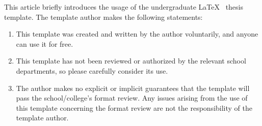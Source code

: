 \begin{abstract}
	
本文简要介绍了本科毕业论文\LaTeX 模板的使用方法。在此，模板作者作声明如下：
\begin{enumerate}
    \item 本模板为作者无偿制作撰写，任何人都可以免费使用本模板。
    \item 本模板未经学校相关部门审核及授权，在使用前请务必斟酌。
    \item 作者不对模板能够通过学校/学院的格式审查做任何明示或暗示的保证，任何由于使用本模板而引起的论文格式审查问题均与本模板作者无关。	
\end{enumerate}




\end{abstract}

\begin{englishabstract}

This article briefly introduces the usage of the undergraduate  \LaTeX~ thesis template. The template author makes the following statements:
\begin{enumerate}
    \item This template was created and written by the author voluntarily, and anyone can use it for free.
    \item This template has not been reviewed or authorized by the relevant school departments, so please carefully consider its use.
    \item The author makes no explicit or implicit guarantees that the template will pass the school/college's format review. Any issues arising from the use of this template concerning the format review are not the responsibility of the template author.
\end{enumerate}



\end{englishabstract}

